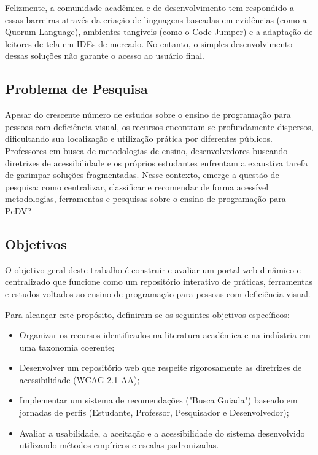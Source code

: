 \documentclass[12pt, a4paper, oneside]{article}
\begin{document}
Felizmente, a comunidade acadêmica e de desenvolvimento tem respondido a essas barreiras através da criação de linguagens baseadas em evidências (como a Quorum Language), ambientes tangíveis (como o Code Jumper) e a adaptação de leitores de tela em IDEs de mercado. No entanto, o simples desenvolvimento dessas soluções não garante o acesso ao usuário final.

\subsection{Problema de Pesquisa}
Apesar do crescente número de estudos sobre o ensino de programação para pessoas com deficiência visual, os recursos encontram-se profundamente dispersos, dificultando sua localização e utilização prática por diferentes públicos. Professores em busca de metodologias de ensino, desenvolvedores buscando diretrizes de acessibilidade e os próprios estudantes enfrentam a exaustiva tarefa de garimpar soluções fragmentadas. Nesse contexto, emerge a questão de pesquisa: como centralizar, classificar e recomendar de forma acessível metodologias, ferramentas e pesquisas sobre o ensino de programação para PcDV?

\subsection{Objetivos}
O objetivo geral deste trabalho é construir e avaliar um portal web dinâmico e centralizado que funcione como um repositório interativo de práticas, ferramentas e estudos voltados ao ensino de programação para pessoas com deficiência visual.

Para alcançar este propósito, definiram-se os seguintes objetivos específicos:
\begin{itemize}
    \item Organizar os recursos identificados na literatura acadêmica e na indústria em uma taxonomia coerente;
    \item Desenvolver um repositório web que respeite rigorosamente as diretrizes de acessibilidade (WCAG 2.1 AA);
    \item Implementar um sistema de recomendações ("Busca Guiada") baseado em jornadas de perfis (Estudante, Professor, Pesquisador e Desenvolvedor);
    \item Avaliar a usabilidade, a aceitação e a acessibilidade do sistema desenvolvido utilizando métodos empíricos e escalas padronizadas.
\end{itemize}
\end{document}
